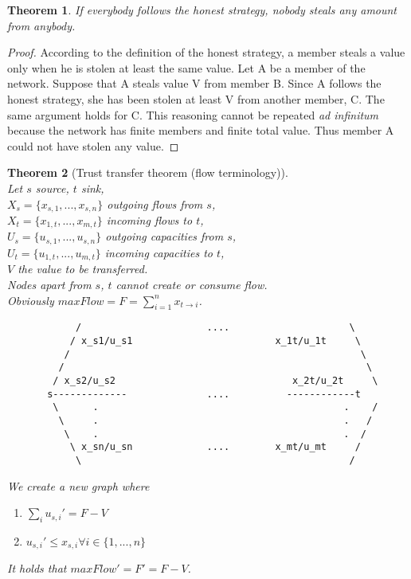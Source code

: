 \documentclass[11pt]{article}
\newtheorem{theorem}{Theorem}[section]
\theoremstyle{definition}
\theoremstyle{corollary}
\begin{document}
    \begin{theorem}
       If everybody follows the honest strategy, nobody steals any amount from anybody.
    \end{theorem}
    \begin{proof}
       According to the definition of the honest strategy, a member steals a value only when he is stolen at least the same value.
       Let A be a member of the network. Suppose that A steals value V from member B. Since A follows the honest strategy, she has
       been stolen at least V from another member, C. The same argument holds for C. This reasoning cannot be repeated
       \textit{ad infinitum} because the network has finite members and finite total value. Thus member A could not have stolen any value.
    \end{proof}
    \begin{theorem}[Trust transfer theorem (flow terminology)] \ \\
    \label{trusttransfer}
       Let $s$ source, $t$ sink, \\
       $X_s = \{x_{s, 1}, ..., x_{s, n}\}$ outgoing flows from $s$, \\
       $X_t = \{x_{1, t}, ..., x_{m, t}\}$ incoming flows to $t$, \\
       $U_s = \{u_{s, 1}, ..., u_{s, n}\}$ outgoing capacities from $s$, \\
       $U_t = \{u_{1, t}, ..., u_{m, t}\}$ incoming capacities to $t$, \\
       $V$ the value to be transferred. \\
       Nodes apart from $s$, $t$ cannot create or consume flow. \\
       Obviously $maxFlow = F = \sum_{i=1}^{n}{x_{t \rightarrow i}}$.
       {\em \begin{lstlisting}
            /                      ....                     \
           / x_s1/u_s1                         x_1t/u_1t     \
          /                                                   \
         /                                                     \
        / x_s2/u_s2                               x_2t/u_2t     \
       s-------------              ....          ------------t
        \      .                                           .    /
         \     .                                           .   /
          \    .                                           .  /
           \ x_sn/u_sn             ....        x_mt/u_mt     /
            \                                               /
       \end{lstlisting}}
       We create a new graph where
       \begin{enumerate}
         \item  $\sum_{i}{u_{s, i}'} = F - V$
         \item $u_{s, i}' \leq x_{s, i} \forall i \in \{1,...,n\}$
       \end{enumerate}
 
       It holds that $maxFlow' = F' = F - V$.
    \end{theorem}
\end{document}
